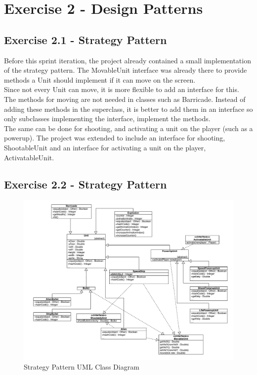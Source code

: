 \section{Exercise 2 - Design Patterns}
\subsection{Exercise 2.1 - Strategy Pattern}
Before this sprint iteration, the project already contained a small implementation of the strategy pattern. The MovableUnit interface was already there to provide methods a Unit should implement if it can move on the screen.\\

Since not every Unit can move, it is more flexible to add an interface for this. 
The methods for moving are not needed in classes such as Barricade. 
Instead of adding these methods in the superclass, it is better to add them in an interface so only subclasses implementing the interface, implement the methods.\\

The same can be done for shooting, and activating a unit on the player (such as a powerup).
The project was extended to include an interface for shooting, ShootableUnit and an interface for activating a unit on the player, ActivatableUnit. 

\subsection{Exercise 2.2 - Strategy Pattern}

\begin{figure}[ht!]
\centering
\includegraphics[width=15cm]{SI-UMLunitStrategy.pdf}
\caption{Strategy Pattern UML Class Diagram}
\label{fig:2-2strategy}
\end{figure}

